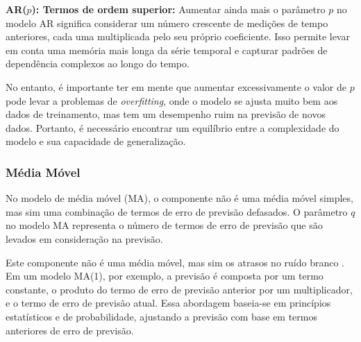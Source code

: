 \textbf{AR($p$): Termos de ordem superior: }
Aumentar ainda mais o parâmetro $p$ no modelo AR significa considerar um número crescente de medições de tempo anteriores, cada uma multiplicada pelo seu próprio coeficiente. Isso permite levar em conta uma memória mais longa da série temporal e capturar padrões de dependência complexos ao longo do tempo.

No entanto, é importante ter em mente que aumentar excessivamente o valor de $p$ pode levar a problemas de \textit{overfitting}, onde o modelo se ajusta muito bem aos dados de treinamento, mas tem um desempenho ruim na previsão de novos dados. Portanto, é necessário encontrar um equilíbrio entre a complexidade do modelo e sua capacidade de generalização.

%

\subsubsection{M\'edia M\'ovel}\label{subsubsec:ma}
No modelo de média móvel (MA), o componente não é uma média móvel simples, mas sim uma combinação de termos de erro de previsão defasados. O parâmetro $q$ no modelo MA representa o número de termos de erro de previsão que são levados em consideração na previsão.

Este componente não é uma média móvel, mas sim os atrasos no ruído branco \cite{signal}.
Em um modelo MA(1), por exemplo, a previsão é composta por um termo constante, o produto do termo de erro de previsão anterior por um multiplicador, e o termo de erro de previsão atual. Essa abordagem baseia-se em princípios estatísticos e de probabilidade, ajustando a previsão com base em termos anteriores de erro de previsão.

